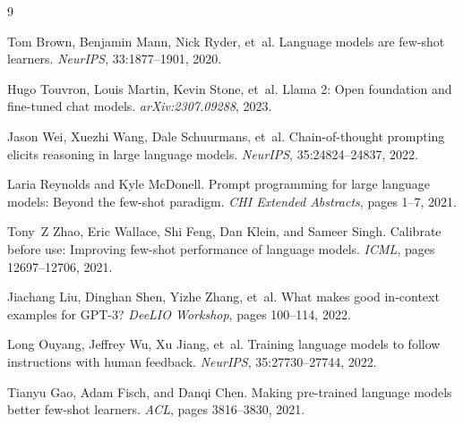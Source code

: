 \documentclass[11pt,a4paper,twocolumn]{article}
\begin{document}
\begin{thebibliography}{9}

Tom Brown, Benjamin Mann, Nick Ryder, et~al.
Language models are few-shot learners.
\textit{NeurIPS}, 33:1877--1901, 2020.

Hugo Touvron, Louis Martin, Kevin Stone, et~al.
Llama 2: Open foundation and fine-tuned chat models.
\textit{arXiv:2307.09288}, 2023.

Jason Wei, Xuezhi Wang, Dale Schuurmans, et~al.
Chain-of-thought prompting elicits reasoning in large language models.
\textit{NeurIPS}, 35:24824--24837, 2022.

Laria Reynolds and Kyle McDonell.
Prompt programming for large language models: Beyond the few-shot paradigm.
\textit{CHI Extended Abstracts}, pages 1--7, 2021.

Tony~Z Zhao, Eric Wallace, Shi Feng, Dan Klein, and Sameer Singh.
Calibrate before use: Improving few-shot performance of language models.
\textit{ICML}, pages 12697--12706, 2021.

Jiachang Liu, Dinghan Shen, Yizhe Zhang, et~al.
What makes good in-context examples for GPT-3?
\textit{DeeLIO Workshop}, pages 100--114, 2022.

Long Ouyang, Jeffrey Wu, Xu Jiang, et~al.
Training language models to follow instructions with human feedback.
\textit{NeurIPS}, 35:27730--27744, 2022.

Tianyu Gao, Adam Fisch, and Danqi Chen.
Making pre-trained language models better few-shot learners.
\textit{ACL}, pages 3816--3830, 2021.

\end{thebibliography}
\end{document}
